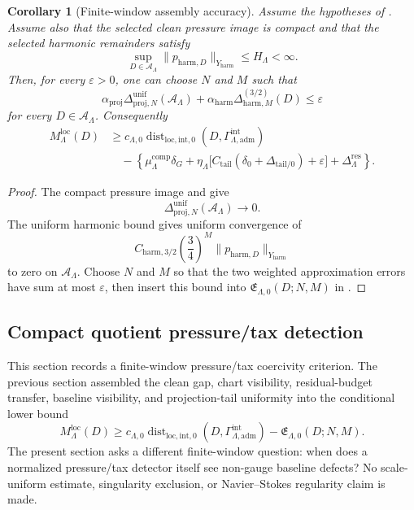 \documentclass[11pt]{article}
\numberwithin{equation}{section}
\newtheorem{corollary}[corollary]{Corollary}
\theoremstyle{definition}
\theoremstyle{remark}
\newcommand{\loc}{\mathrm{loc}}
\newcommand{\intg}{\mathrm{int}}
\newcommand{\tail}{\mathrm{tail}}
\newcommand{\adm}{\mathrm{adm}}
\newcommand{\proj}{\mathrm{proj}}
\newcommand{\harm}{\mathrm{harm}}
\newcommand{\Dist}{\operatorname{dist}}
\newcommand{\Gammaadm}{\Gamma^{\intg}_{\Lambda,\adm}}
\begin{document}
\begin{corollary}[Finite-window assembly accuracy]
\label{cor:assembly-accuracy}
Assume the hypotheses of .  Assume
also that the selected clean pressure image is compact and that the selected
harmonic remainders satisfy
\[
    \sup_{D\in\mathcal A_\Lambda}
    \|p_{\harm,D}\|_{Y_{\harm}}
    \le H_\Lambda<\infty.
\]
Then, for every \(\varepsilon>0\), one can choose \(N\) and \(M\) such that
\[
    \alpha_{\proj}
    \Delta^{\mathrm{unif}}_{\proj,N}(\mathcal A_\Lambda)
    +
    \alpha_{\harm}
    \Delta_{\harm,M}^{(3/2)}(D)
    \le
    \varepsilon
\]
for every \(D\in\mathcal A_\Lambda\).  Consequently
\[
\begin{aligned}
    M^{\loc}_\Lambda(D)
    &\ge
    c_{\Lambda,0}
    \Dist_{\loc,\intg,0}(D,\Gammaadm)
\\
    &\quad
    -
    \left\{
        \mu^{\mathrm{comp}}_\Lambda\delta_G
        +
        \eta_\Lambda
        \bigl[
            C_{\tail}(\delta_0+\Delta_{\tail/0})
            +
            \varepsilon
        \bigr]
        +
        \Delta_\Lambda^{\mathrm{res}}
    \right\}.
\end{aligned}
\]
\end{corollary}

\begin{proof}
The compact pressure image and
 give
\[
    \Delta^{\mathrm{unif}}_{\proj,N}(\mathcal A_\Lambda)\to0.
\]
The uniform harmonic bound gives uniform convergence of
\[
    C_{\harm,3/2}\left(\frac34\right)^M
    \|p_{\harm,D}\|_{Y_{\harm}}
\]
to zero on \(\mathcal A_\Lambda\).  Choose \(N\) and \(M\) so that the two
weighted approximation errors have sum at most \(\varepsilon\), then insert
this bound into \(\mathfrak E_{\Lambda,0}(D;N,M)\) in
.
\end{proof}


\subsection{Compact quotient pressure/tax detection}
\label{sec:pressure-tax-coercivity}

This section records a finite-window pressure/tax coercivity criterion.  The
previous section assembled the clean gap, chart visibility, residual-budget
transfer, baseline visibility, and projection-tail uniformity into the
conditional lower bound
\[
    M^{\loc}_\Lambda(D)
    \ge
    c_{\Lambda,0}\Dist_{\loc,\intg,0}(D,\Gammaadm)
    -
    \mathfrak E_{\Lambda,0}(D;N,M).
\]
The present section asks a different finite-window question: when does a
normalized pressure/tax detector itself see non-gauge baseline defects?  No
scale-uniform estimate, singularity exclusion, or Navier--Stokes regularity
claim is made.
\end{document}
